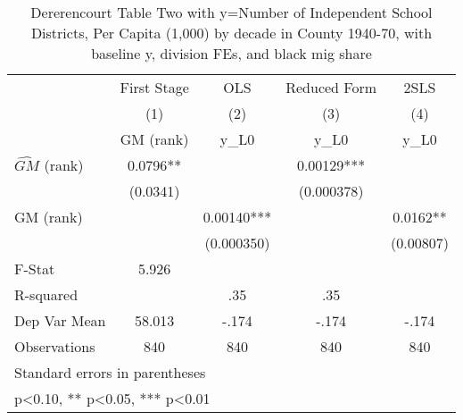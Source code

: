 \begin{table}[htbp]\centering
\def\sym#1{\ifmmode^{#1}\else\(^{#1}\)\fi}
\caption{Dererencourt Table Two with y=Number of Independent School Districts, Per Capita (1,000) by decade in County 1940-70, with baseline y, division FEs, and black mig share}
\begin{tabular}{l*{4}{c}}
\toprule
                    & First Stage   &         OLS   &Reduced Form   &        2SLS   \\
                    &\multicolumn{1}{c}{(1)}&\multicolumn{1}{c}{(2)}&\multicolumn{1}{c}{(3)}&\multicolumn{1}{c}{(4)}\\
                    &\multicolumn{1}{c}{GM  (rank)}&\multicolumn{1}{c}{y\_L0}&\multicolumn{1}{c}{y\_L0}&\multicolumn{1}{c}{y\_L0}\\
\midrule
$\hat{GM}$ (rank)   &      0.0796** &               &     0.00129***&               \\
                    &    (0.0341)   &               &  (0.000378)   &               \\
\addlinespace
GM  (rank)          &               &     0.00140***&               &      0.0162** \\
                    &               &  (0.000350)   &               &   (0.00807)   \\
\midrule
F-Stat              &       5.926   &               &               &               \\
R-squared           &               &         .35   &         .35   &               \\
Dep Var Mean        &      58.013   &       -.174   &       -.174   &       -.174   \\
Observations        &         840   &         840   &         840   &         840   \\
\bottomrule
\multicolumn{5}{l}{\footnotesize Standard errors in parentheses}\\
\multicolumn{5}{l}{\footnotesize * p<0.10, ** p<0.05, *** p<0.01}\\
\end{tabular}
\end{table}
